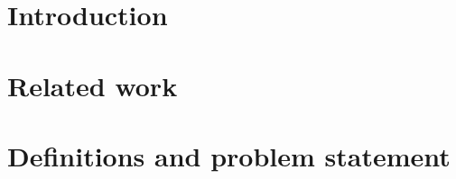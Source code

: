 \documentclass{article}
\begin{document}

\clearpage
\section{Introduction}

\section{Related work}

\section{Definitions and problem statement}\label{sec:pf}


{\scriptsize

}
\end{document}
